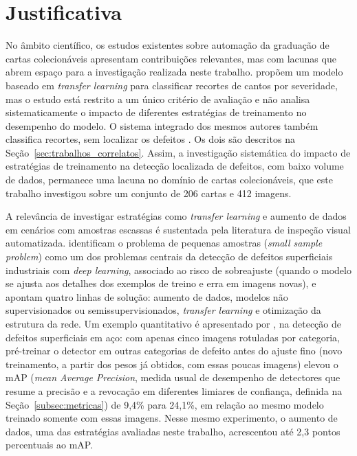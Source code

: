 \documentclass[
    12pt,                %
    openright,           %
    oneside,             %
    a4paper,             %
    english,             %
    brazil               %
]{abntex2}
\begin{document}
\section{Justificativa}
\label{sec:justificativa}

No âmbito científico, os estudos existentes sobre automação da
graduação de cartas colecionáveis apresentam contribuições relevantes, mas com
lacunas que abrem espaço para a investigação realizada neste trabalho.
 propõem um modelo baseado em \textit{transfer
learning} para classificar recortes de cantos por severidade, mas o
estudo está restrito a um único
critério de avaliação e não analisa sistematicamente o impacto de
diferentes estratégias de treinamento no desempenho do modelo. O
sistema integrado dos mesmos autores também classifica recortes, sem
localizar os defeitos \cite{Nahar2025b}. Os dois são descritos na
Seção~\ref{sec:trabalhos_correlatos}. Assim, a investigação
sistemática do impacto de estratégias de treinamento na detecção
localizada de defeitos, com baixo volume de dados,
permanece uma lacuna no domínio de cartas colecionáveis, que este
trabalho investigou sobre um conjunto de 206 cartas e 412 imagens.

A relevância de investigar estratégias como
\textit{transfer learning} e aumento de dados em cenários
com amostras escassas é sustentada pela literatura de
inspeção visual automatizada. 
identificam o problema de pequenas amostras
(\textit{small sample problem}) como um dos problemas
centrais da detecção de defeitos superficiais industriais com
\textit{deep learning}, associado ao risco de sobreajuste (quando o
modelo se ajusta aos detalhes dos exemplos de treino e erra em imagens
novas), e
apontam quatro linhas de solução: aumento de dados, modelos
não supervisionados ou semissupervisionados,
\textit{transfer learning} e otimização da estrutura da rede.
Um exemplo quantitativo é apresentado por ,
na detecção de defeitos superficiais em aço: com apenas cinco
imagens rotuladas por categoria, pré-treinar o detector em
outras categorias de defeito antes do ajuste fino (novo treinamento,
a partir dos pesos já obtidos, com essas poucas imagens) elevou o mAP
(\textit{mean Average Precision}, medida usual de desempenho de
detectores que resume a precisão e a revocação em diferentes limiares
de confiança, definida na Seção~\ref{subsec:metricas})
de 9,4\% para 24,1\%, em relação ao mesmo modelo treinado
somente com essas imagens. Nesse mesmo experimento, o aumento de
dados, uma das estratégias avaliadas neste trabalho, acrescentou até
2,3 pontos percentuais ao mAP.
\end{document}
